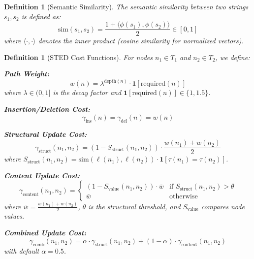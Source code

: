\documentclass{article}
\newtheorem{definition}[theorem]{Definition}
\begin{document}
\begin{definition}[Semantic Similarity]
\label{def:semantic-sim}
The semantic similarity between two strings $s_1, s_2$ is defined as:
\begin{equation}
    \text{sim}(s_1, s_2) = \frac{1 + \langle \phi(s_1), \phi(s_2) \rangle}{2} \in [0, 1]
\end{equation}
where $\langle \cdot, \cdot \rangle$ denotes the inner product (cosine similarity for normalized vectors).
\end{definition}

\begin{definition}[STED Cost Functions]
\label{def:cost-functions}
For nodes $n_1 \in T_1$ and $n_2 \in T_2$, we define:

\textbf{Path Weight:}
\begin{equation}
    w(n) = \lambda^{\text{depth}(n)} \cdot \mathbf{1}[\text{required}(n)]
\end{equation}
where $\lambda \in (0, 1]$ is the decay factor and $\mathbf{1}[\text{required}(n)] \in \{1, 1.5\}$.

\textbf{Insertion/Deletion Cost:}
\begin{equation}
    \gamma_{\text{ins}}(n) = \gamma_{\text{del}}(n) = w(n)
\end{equation}

\textbf{Structural Update Cost:}
\begin{equation}
    \gamma_{\text{struct}}(n_1, n_2) = (1 - S_{\text{struct}}(n_1, n_2)) \cdot \frac{w(n_1) + w(n_2)}{2}
\end{equation}
where $S_{\text{struct}}(n_1, n_2) = \text{sim}(\ell(n_1), \ell(n_2)) \cdot \mathbf{1}[\tau(n_1) = \tau(n_2)]$.

\textbf{Content Update Cost:}
\begin{equation}
    \gamma_{\text{content}}(n_1, n_2) = \begin{cases}
        (1 - S_{\text{value}}(n_1, n_2)) \cdot \bar{w} & \text{if } S_{\text{struct}}(n_1, n_2) > \theta \\
        \bar{w} & \text{otherwise}
    \end{cases}
\end{equation}
where $\bar{w} = \frac{w(n_1) + w(n_2)}{2}$, $\theta$ is the structural threshold, and $S_{\text{value}}$ compares node values.

\textbf{Combined Update Cost:}
\begin{equation}
    \gamma_{\text{comb}}(n_1, n_2) = \alpha \cdot \gamma_{\text{struct}}(n_1, n_2) + (1-\alpha) \cdot \gamma_{\text{content}}(n_1, n_2)
\end{equation}
with default $\alpha = 0.5$.
\end{definition}
\end{document}
